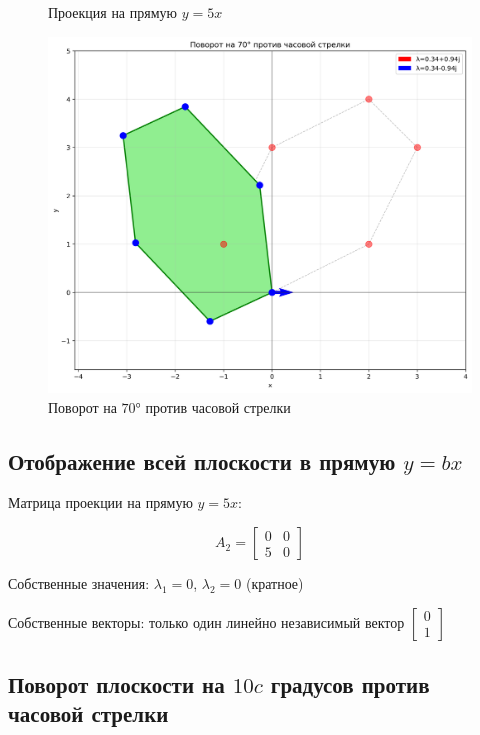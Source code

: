 \begin{figure}[h]
\begin{minipage}{0.31\textwidth}
\caption{Проекция на прямую $y = 5x$}
\label{fig:projection_y_bx}
\end{minipage}
\hfill
\begin{minipage}{0.31\textwidth}
\centering
\includegraphics[width=\textwidth]{images/task1/rotation_10c_degrees.png}
\caption{Поворот на $70°$ против часовой стрелки}
\label{fig:rotation_10c_degrees}
\end{minipage}
\end{figure}

\subsection*{Отображение всей плоскости в прямую $y = bx$}

Матрица проекции на прямую $y = 5x$:

\begin{equation}
A_2 = \begin{bmatrix} 0 & 0 \\ 5 & 0 \end{bmatrix}
\end{equation}

Собственные значения: $\lambda_1 = 0$, $\lambda_2 = 0$ (кратное)

Собственные векторы: только один линейно независимый вектор $\begin{bmatrix} 0 \\ 1 \end{bmatrix}$

\subsection*{Поворот плоскости на $10c$ градусов против часовой стрелки}

